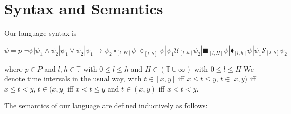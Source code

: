 \documentclass[10pt,a4paper]{article}
\begin{document}
\section{Syntax and Semantics}
Our language syntax is

$$\psi =  p | \neg \psi | \psi_1 \wedge \psi_2 | \psi_1 \vee \psi_2 | \psi_1 \rightarrow \psi_2 | \square_{[l,H]} \psi | \lozenge_{[l,h]} \psi | \psi_1 \mathcal{U}_{[l,h]} \psi_2 | \blacksquare_{[l,H]} \psi | \blacklozenge_{[l,h]} \psi | \psi_1 \mathcal{S}_{[l,h]} \psi_2$$

where $p \in P$ and $l,h \in \mathbb{T}$ with $0 \leq l \leq h$ and $H \in (\mathbb{T} \cup \infty)$ with $0 \leq l \leq H$
%
We denote time intervals in the usual way, with $t \in [x,y]$ iff $x \leq t \leq y$, $t \in [x,y)$ iff $x \leq t < y$, $t \in (x,y]$ iff $x < t \leq y$ and $t \in (x,y)$ iff $x < t < y$.

The semantics of our language are defined inductively as follows:
\end{document}

